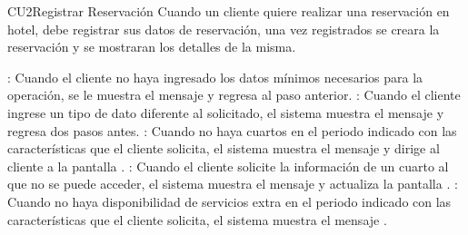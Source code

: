 \begin{UseCase}{CU2}{Registrar Reservación}{
		Cuando un cliente quiere realizar una reservación en hotel, debe registrar sus datos de reservación, una vez registrados se creara la reservación y se mostraran los detalles de la misma.
	}
{\begin{Titemize}
			: Cuando el cliente no haya ingresado los datos mínimos necesarios para la operación, se le muestra el mensaje   y regresa al paso anterior.
			: Cuando el cliente ingrese un tipo de dato diferente al solicitado, el sistema muestra el mensaje  y regresa dos pasos antes.
			: Cuando no haya cuartos en el periodo indicado con las características que el cliente solicita, el sistema muestra el mensaje  y dirige al cliente a la pantalla .
			: Cuando el cliente solicite la información de un cuarto al que no se puede acceder, el sistema muestra el mensaje  y actualiza la pantalla .
			: Cuando no haya disponibilidad de servicios extra en el periodo indicado con las características que el cliente solicita, el sistema muestra el mensaje .
		\end{Titemize}
	}
\end{UseCase}

